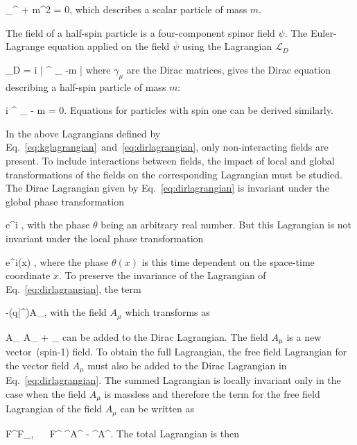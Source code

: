 {
 \partial_{\mu}\partial^{\mu} \phi + m^{2} \phi = 0,
}
which describes a scalar particle of mass $m$. 

The field of a half-spin particle is a four-component spinor field $\psi$. The Euler-Lagrange equation applied on the field $\bar{\psi}$ using the Lagrangian $\mathcal{L}_{D}$


{
 _{D} = i \bar{\psi} \gamma^{\mu} \partial_{\mu} \psi -m \bar{\psi} \psi
}
where $\gamma_{\mu}$ are the Dirac matrices, gives the Dirac equation describing a half-spin particle of mass $m$:

{
  i \gamma^{\mu} \partial_{\mu} \psi - m \psi = 0.
}
Equations for particles with spin one can be derived similarly.

In the above Lagrangians defined by Eq.~\ref{eq:kglagrangian}~and~\ref{eq:dirlagrangian}, only non-interacting fields are present. To include interactions between fields, the impact of local and global transformations of the fields on the corresponding Lagrangian must be studied. The Dirac Lagrangian given by Eq.~\ref{eq:dirlagrangian} is invariant under the global phase transformation

{
\psi \to e^{i\theta} \psi, 
}
with the phase $\theta$ being an arbitrary real number. But this Lagrangian is not invariant under the local phase transformation 

{
\psi \to e^{i\theta (x)} \psi,
}
where the phase $\theta(x)$ is this time dependent on the space-time coordinate $x$. To preserve the invariance of the Lagrangian of Eq.~\ref{eq:dirlagrangian}, the term 

{
-(q\bar{\psi}\gamma^{\mu}\psi)A_{\mu}, 
}
with the field $A_{\mu}$ which transforms as 

{
A_{\mu} \to A_{\mu} + \partial_{\mu} \lambda
}
can be added to the Dirac Lagrangian. The field $A_{\mu}$ is a new vector~(spin-1) field. To obtain the full Lagrangian, the free field Lagrangian for the vector field $A_{\mu}$ must also be added to the Dirac Lagrangian in Eq.~\ref{eq:dirlagrangian}. The summed Lagrangian is locally invariant only in the case when the field $A_{\mu}$ is massless and therefore the term for the free field Lagrangian of the field $A_{\mu}$ can be written as

{
    F^{\mu\nu}F_{\mu\nu}, ~~ F^{\mu\nu} \equiv \partial^{\mu}A^{\nu} - \partial^{\nu}A^{\mu}.
} 
The total Lagrangian is then

